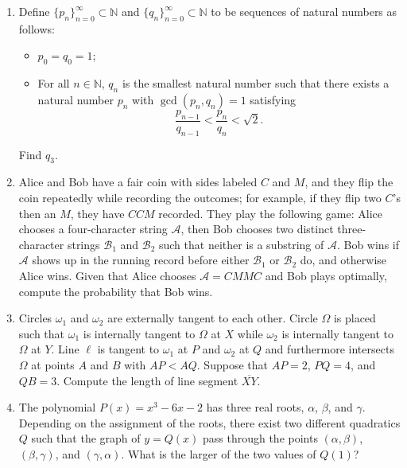 \documentclass[10pt]{article}
\newcommand{\N}{\mathbb{N}}
\newcommand{\calA}{\mathcal{A}}
\newcommand{\calB}{\mathcal{B}}
\begin{document}
\begin{enumerate}
\item Define $\{p_n\}_{n=0}^\infty\subset\N$ and $\{q_n\}_{n=0}^\infty\subset\N$ to be sequences of natural numbers as follows:

\begin{itemize}

\item $p_0=q_0=1$;

\item For all $n\in\N$, $q_n$ is the smallest natural number such that there exists a natural number $p_n$ with $\gcd(p_n,q_n)=1$ satisfying \[\dfrac{p_{n-1}}{q_{n-1}} < \dfrac{p_n}{q_n} < \sqrt 2.\]

\end{itemize}

Find $q_3$.

\item Alice and Bob have a fair coin with sides labeled $C$ and $M$, and they flip the coin repeatedly while recording the outcomes; for example, if they flip two $C$'s then an $M$, they have $CCM$ recorded. They play the following game: Alice chooses a four-character string $\calA$, then Bob chooses two distinct three-character strings $\calB_1$ and $\calB_2$ such that neither is a substring of $\calA$. Bob wins if $\calA$ shows up in the running record before either $\calB_1$ or $\calB_2$ do, and otherwise Alice wins. Given that Alice chooses $\calA = CMMC$ and Bob plays optimally, compute the probability that Bob wins.

\item Circles $\omega_1$ and $\omega_2$ are externally tangent to each other.  Circle $\Omega$ is placed such that $\omega_1$ is internally tangent to $\Omega$ at $X$ while $\omega_2$ is internally tangent to $\Omega$ at $Y$.  Line $\ell$ is tangent to $\omega_1$ at $P$ and $\omega_2$ at $Q$ and furthermore intersects $\Omega$ at points $A$ and $B$ with $AP<AQ$.  Suppose that $AP=2$, $PQ=4$, and $QB=3$.  Compute the length of line segment $\overline{XY}$.

\item The polynomial $P(x) = x^3 - 6x - 2$ has three real roots, $\alpha$, $\beta$, and $\gamma$.  Depending on the assignment of the roots, there exist two different quadratics $Q$ such that the graph of $y=Q(x)$ pass through the points $(\alpha,\beta)$, $(\beta,\gamma)$, and $(\gamma,\alpha)$.  What is the larger of the two values of $Q(1)$?

\end{enumerate}
\end{document}
